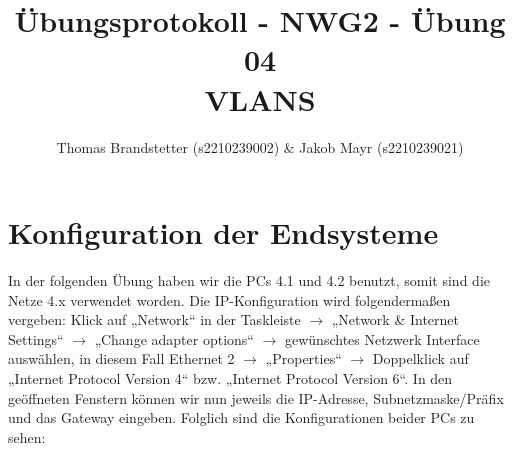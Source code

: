\documentclass{article}
\title{Übungsprotokoll - NWG2 - Übung 04 \\ VLANS}
\author{\vspace{0.5cm} Thomas Brandstetter (s2210239002) \& Jakob Mayr (s2210239021)}
\begin{document}
\maketitle

\section{Konfiguration der Endsysteme}

In der folgenden Übung haben wir die PCs 4.1 und 4.2 benutzt, somit sind die Netze 4.x verwendet worden. Die IP-Konfiguration wird folgendermaßen vergeben: Klick auf „Network“ in der Taskleiste $\rightarrow$ „Network \& Internet Settings“ $\rightarrow$ „Change adapter options“ $\rightarrow$ gewünschtes Netzwerk Interface auswählen, in diesem Fall Ethernet 2 $\rightarrow$ „Properties“ $\rightarrow$ Doppelklick auf „Internet Protocol Version 4“ bzw. „Internet Protocol Version 6“. In den geöffneten Fenstern können wir nun jeweils die IP-Adresse, Subnetzmaske/Präfix und das Gateway eingeben. Folglich sind die Konfigurationen beider PCs zu sehen:
\end{document}
